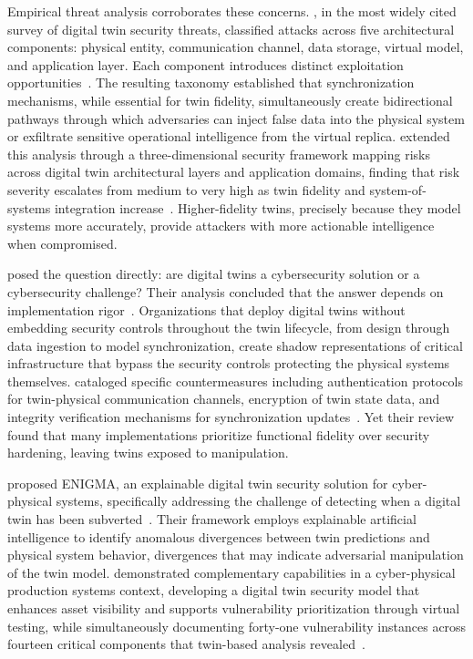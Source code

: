 Empirical threat analysis corroborates these concerns. \citeauthor{Alcaraz_Lopez_2022}, in the most widely cited survey of digital twin security threats, classified attacks across five architectural components: physical entity, communication channel, data storage, virtual model, and application layer. Each component introduces distinct exploitation opportunities~\parencite{Alcaraz_Lopez_2022}. The resulting taxonomy established that synchronization mechanisms, while essential for twin fidelity, simultaneously create bidirectional pathways through which adversaries can inject false data into the physical system or exfiltrate sensitive operational intelligence from the virtual replica. \citeauthor{Jeremiah_2024} extended this analysis through a three-dimensional security framework mapping risks across digital twin architectural layers and application domains, finding that risk severity escalates from medium to very high as twin fidelity and system-of-systems integration increase~\parencite{Jeremiah_2024}. Higher-fidelity twins, precisely because they model systems more accurately, provide attackers with more actionable intelligence when compromised.

\citeauthor{Holmes_2021} posed the question directly: are digital twins a cybersecurity solution or a cybersecurity challenge? Their analysis concluded that the answer depends on implementation rigor~\parencite{Holmes_2021}. Organizations that deploy digital twins without embedding security controls throughout the twin lifecycle, from design through data ingestion to model synchronization, create shadow representations of critical infrastructure that bypass the security controls protecting the physical systems themselves. \citeauthor{Karaarslan_Babiker_2021} cataloged specific countermeasures including authentication protocols for twin-physical communication channels, encryption of twin state data, and integrity verification mechanisms for synchronization updates~\parencite{Karaarslan_Babiker_2021}. Yet their review found that many implementations prioritize functional fidelity over security hardening, leaving twins exposed to manipulation.

\citeauthor{Suhail_ENIGMA_2023} proposed ENIGMA, an explainable digital twin security solution for cyber-physical systems, specifically addressing the challenge of detecting when a digital twin has been subverted~\parencite{Suhail_ENIGMA_2023}. Their framework employs explainable artificial intelligence to identify anomalous divergences between twin predictions and physical system behavior, divergences that may indicate adversarial manipulation of the twin model. \citeauthor{Jiang_2024_CPPS} demonstrated complementary capabilities in a cyber-physical production systems context, developing a digital twin security model that enhances asset visibility and supports vulnerability prioritization through virtual testing, while simultaneously documenting forty-one vulnerability instances across fourteen critical components that twin-based analysis revealed~\parencite{Jiang_2024_CPPS}.

